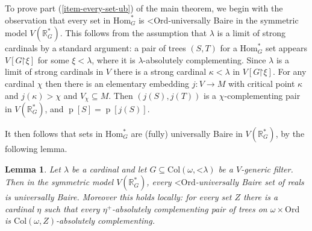 \documentclass[fleqn, 11pt]{amsart}
\theoremstyle{plain}
\newtheorem{lem}[thm]{Lemma} \newtheorem*{lem*}{Lemma}
\theoremstyle{definition}
\theoremstyle{remark}
\newcommand{\Ord}{\mathrm{Ord}}
\newcommand{\Hom}{\mathrm{Hom}}
\newcommand{\ScS}{\mathrm{ScS}}
\newcommand{\uB}{\mathrm{uB}}
\newcommand{\bbR}{\mathbb{R}}
\newcommand{\Col}{\mathrm{Col}}
\newcommand{\restrict}{\mathord{\restriction}}
\DeclareMathOperator{\p}{p}
\begin{document}
To prove part (\ref{item-every-set-ub}) of the main theorem, we begin with the observation that every set in $\Hom^*_G$ is $\mathord{<}\Ord$-universally Baire in the symmetric model $V(\mathbb{R}^*_G)$. This follows from the assumption that $\lambda$ is a limit of strong cardinals by a standard argument: a pair of trees $(S,T)$ for a $\Hom^*_G$ set appears $V[G\restrict \xi]$ for some $\xi < \lambda$, where it is $\lambda$-absolutely complementing. Since $\lambda$ is a limit of strong cardinals in $V$ there is a strong cardinal $\kappa < \lambda$ in $V[G\restrict \xi]$. For any cardinal $\chi$ then there is an elementary embedding $j \colon V \to M$ with critical point $\kappa$ and $j(\kappa) > \chi$ and $V_{\chi} \subseteq M$. Then $(j(S), j(T))$ is a $\chi$-complementing pair in $V(\bbR^{*}_{G})$, and $\p[S] = \p[j(S)]$.  





	




It then follows that sets in $\Hom^*_G$ are  (fully) universally Baire in $V(\mathbb{R}^*_G)$, by the following lemma. 



\begin{lem}\label{lem-ordinal-ac-equivalent}
 Let $\lambda$ be a cardinal and let $G \subseteq \Col(\omega,\mathord{<}\lambda)$ be a $V$-generic filter. Then in the symmetric model $V(\mathbb{R}^*_G)$, every $\mathord{<}\Ord$-universally Baire set of reals is universally Baire. Moreover this holds locally: for every set $Z$ there is a cardinal $\eta$ such that every $\eta^{+}$-absolutely complementing pair of trees on $\omega \times \Ord$ is $\Col(\omega,Z)$-absolutely complementing.
\end{lem}
\end{document}
